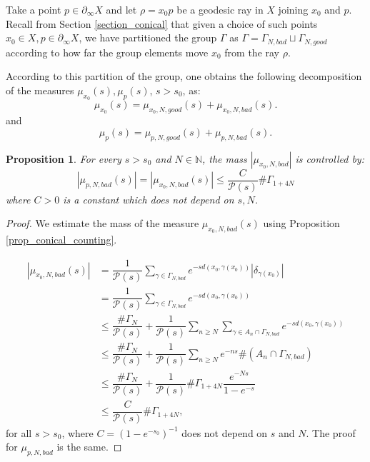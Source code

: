 \documentclass[12pt]{amsbook}%
\newtheorem{prop}[thm]{Proposition}
\theoremstyle{definition}
\theoremstyle{remark}
\numberwithin{section}{chapter}
\numberwithin{subsection}{section}
\numberwithin{figure}{chapter}
\def\cP{{\mathscr{P}}}
\def\Ga{\Gamma}
\def\La{\Lambda}
\def\geo{\partial_\infty}
\begin{document}
{{Take a point $p \in \geo  X$ and let  $\rho=x_0p$ be a geodesic ray in $X$ joining $x_0$ and $p$. 
Recall from Section \ref{section_conical} that given a choice of such points $x_0\in X, p\in \geo X$, we have partitioned 
the group $\Gamma$ as $\Gamma = \Gamma_{N,bad} \sqcup \Gamma_{N,good}$ according to how far the group elements 
move $x_0$ from the ray $\rho$.    

According to this partition of the group, one obtains the following decomposition of the measures $\mu_{x_0}(s), \mu_p(s)$, $s>s_0$, as: 
\begin{equation}
\mu_{x_0}(s) =   \mu_{x_0,  N, good}(s) + \mu_{x_0,N, bad}(s). 
\end{equation}
and 
\begin{equation}
\mu_p(s) =   \mu_{p,  N, good}(s) + \mu_{p,N, bad}(s). 
\end{equation}

\begin{prop} \label{prop_mass_bad_orbits_PS} For every $s > s_0$ and $N\in \mathbb N$, %
the mass $|\mu_{x_0,N,bad}|$ is controlled by: 
\begin{equation}
|\mu_{p,N,bad}(s)| =|\mu_{x_0,N,bad}(s)| \leqslant \dfrac{C}{\cP(s)} \#  \Gamma_{1+4N}  
\end{equation}
where $C>0$ is a constant which does not depend on $s, N$.
\end{prop}

\begin{proof}

We estimate the mass of the measure $\mu_{x_0,N,bad}(s)$ using Proposition \ref{prop_conical_counting}.

\begin{align*}
|\mu_{x_0, N,bad}(s)| &= \dfrac{1}{\cP(s)} \sum_{\gamma\in \Gamma_{N,bad}} e^{-s d(x_0, \gamma(x_0))} |\delta_{\gamma(x_0)}| \\
 & = \dfrac{1}{\cP(s)} \sum_{\gamma\in \Gamma_{N,bad}} e^{-s d(x_0, \gamma(x_0))} \\
  &  \leqslant  \dfrac{\# \Gamma_N}{\cP(s)} + \dfrac{1}{\cP(s)} \sum_{n \geqslant N} \sum_{\gamma\in A_n \cap \Gamma_{N,bad}} e^{-s d(x_0, \gamma(x_0))} 
   \\
  & \leqslant \dfrac{\# \Gamma_N}{\cP(s)} + \dfrac{1}{\cP(s)}  \sum_{n \geqslant N} e^{-n s} \# (A_n \cap \Gamma_{N,bad}) 
   \\
  & \leqslant  \dfrac{\# \Gamma_N}{\cP(s)} + \dfrac{1}{\cP(s)} \# \Gamma_{1+4N}  \dfrac{e^{-Ns}}{1 -e^{-s}}   \\
  & \leqslant \dfrac{C}{\cP(s)} \# \Gamma_{1+4N}, 
\end{align*}
for all $s > s_0$, where $C= (1 -e^{-s_0})^{-1}$ does not depend on $s$ and $N$. 
The proof for $ \mu_{p, N,bad}$ is the same. 
\end{proof} 


}}
\end{document}
